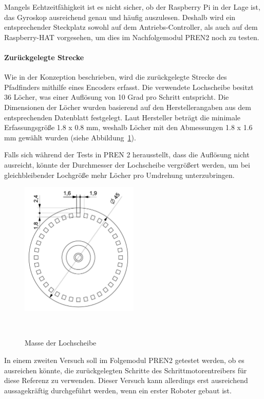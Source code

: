 \documentclass[main.tex]{subfiles} %
\begin{document}
Mangels Echtzeitfähigkeit ist es nicht sicher, ob der Raspberry Pi in der Lage
ist, das Gyroskop ausreichend genau und häufig auszulesen. Deshalb wird ein
entsprechender Steckplatz sowohl auf dem Antriebs-Controller, als auch auf dem
Raspberry-HAT vorgesehen, um dies im Nachfolgemodul PREN2 noch zu testen.

\paragraph{Zurückgelegte Strecke}
Wie in der Konzeption beschrieben, wird die zurückgelegte Strecke des 
Pfadfinders mithilfe eines Encoders erfasst. Die verwendete Lochscheibe 
besitzt 36 Löcher, was einer Auflösung von 10 Grad pro Schritt entspricht. 
Die Dimensionen der Löcher wurden basierend auf den Herstellerangaben aus 
dem entsprechenden Datenblatt festgelegt. Laut Hersteller beträgt die 
minimale Erfassungsgröße 1.8 x 0.8 mm, weshalb Löcher mit den Abmessungen 
1.8 x 1.6 mm gewählt wurden 
(siehe Abbildung~\ref{fig:Lochscheibe_Vermasst}).

Falls sich während der Tests in PREN 2 herausstellt, dass die Auflösung nicht 
ausreicht, könnte der Durchmesser der Lochscheibe vergrößert werden, um bei 
gleichbleibender Lochgröße mehr Löcher pro Umdrehung unterzubringen.

\begin{figure}[H]
    \centering
    \includegraphics[width=0.5\textwidth]{./fig_Strecke_Tracken/Encoderscheibe_Vermasst.pdf}
    \caption{Masse der Lochscheibe}~\label{fig:Lochscheibe_Vermasst}
\end{figure}

In einem zweiten Versuch soll im Folgemodul PREN2 getestet werden, ob es
ausreichen könnte, die zurückgelegten Schritte des Schrittmotorentreibers für
diese Referenz zu verwenden. Dieser Versuch kann allerdings erst ausreichend
aussagekräftig durchgeführt werden, wenn ein erster Roboter gebaut ist.
\end{document}
